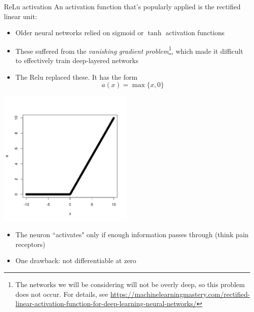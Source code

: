 \documentclass{beamer}
\begin{document}
\begin{frame}{ReLu activation}
An activation function that's popularly applied is the rectified linear unit:
\begin{itemize}
\item Older neural networks relied on sigmoid or $\tanh$ activation functions
\item These suffered from the \textit{vanishing gradient problem}\footnote{The networks we will be considering will not be overly deep, so this problem does not occur. For details, see \url{https://machinelearningmastery.com/rectified-linear-activation-function-for-deep-learning-neural-networks/}}, which made it difficult to effectively train deep-layered networks
\item The Relu replaced these. It has the form
\[
a(x)=\max\{x,0\}
\]
\end{itemize}
\begin{minipage}{0.49\linewidth}
\includegraphics[width=0.5\textwidth]{Images/ReLu.png}
\end{minipage}
\begin{minipage}{0.49\linewidth}
\begin{itemize}
\item The neuron ``activates" only if enough information passes through (think pain receptors)
\item One drawback: not differentiable at zero
\end{itemize}
\end{minipage}
\end{frame}
\end{document}
